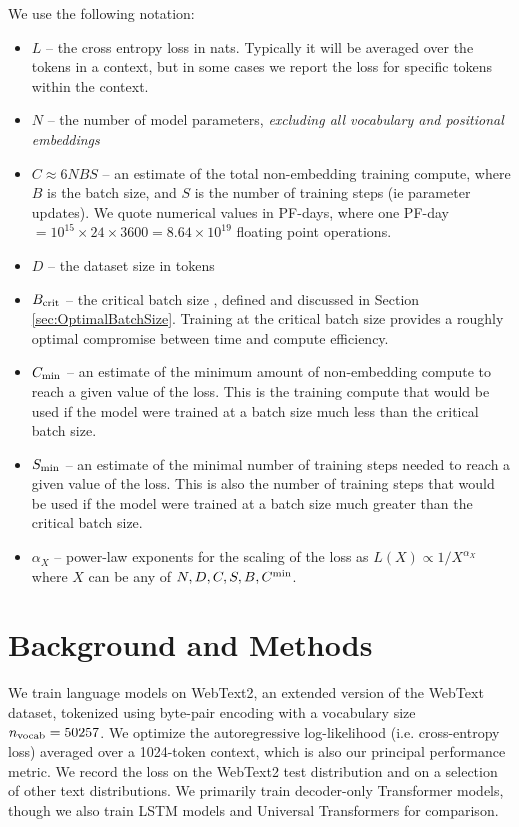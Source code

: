 \documentclass[english]{article}
\begin{document}
We use the following notation:
\begin{itemize}
\item $L$ -- the cross entropy loss in nats.  Typically it will be averaged over the tokens in a context, but in some cases we report the loss for specific tokens within the context.
\item $N$ -- the number of model parameters, \emph{excluding all vocabulary and positional embeddings}  
\item $C \approx 6 N B S$ -- an estimate of the total non-embedding training compute, where $B$ is the batch size, and $S$ is the number of training steps (ie parameter updates). We quote numerical values in PF-days, where one PF-day $ = 10^{15} \times 24 \times 3600 = 8.64 \times 10^{19}$ floating point operations.  
\item $D$ -- the dataset size in tokens
\item $B_{\rm crit}$ -- the critical batch size \cite{1812.06162}, defined and discussed in Section \ref{sec:OptimalBatchSize}.  Training at the critical batch size provides a roughly optimal compromise between time and compute efficiency.
\item $C_{\rm min}$ -- an estimate of the minimum amount of non-embedding compute to reach a given value of the loss.  This is the training compute that would be used if the model were trained at a batch size much less than the critical batch size.  
\item $S_{\rm min}$ -- an estimate of the minimal number of training steps needed to reach a given value of the loss.  This is also the number of training steps that would be used if the model were trained at a batch size much greater than the critical batch size.
\item $\alpha_X$ -- power-law exponents for the scaling of the loss as $L(X) \propto 1/X^{\alpha_X}$ where $X$ can be any of $N, D, C, S, B, C^{\rm min}$.
\end{itemize}


\section{Background and Methods}

We train language models on WebText2, an extended version of the WebText \cite{radford2019language} dataset, tokenized using byte-pair encoding \cite{BPE} with a vocabulary size $n_{\rm vocab} = 50257$.  We optimize the autoregressive log-likelihood (i.e. cross-entropy loss) averaged over a 1024-token context, which is also our principal performance metric.  We record the loss on the WebText2 test distribution and on a selection of other text distributions.  We primarily train decoder-only \cite{liu2018generating, radford2018improving} Transformer \cite{OriginalTransformer} models, though we also train LSTM models and Universal Transformers \cite{DBLP:journals/corr/abs-1807-03819}  for comparison.
\end{document}

